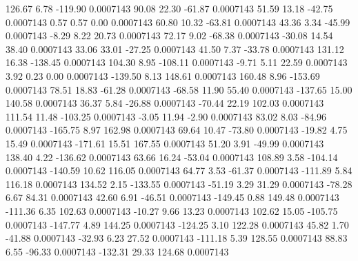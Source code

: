       126.67        6.78     -119.90     0.0007143
       90.08       22.30      -61.87     0.0007143
       51.59       13.18      -42.75     0.0007143
        0.57        0.57        0.00     0.0007143
       60.80       10.32      -63.81     0.0007143
       43.36        3.34      -45.99     0.0007143
       -8.29        8.22       20.73     0.0007143
       72.17        9.02      -68.38     0.0007143
      -30.08       14.54       38.40     0.0007143
       33.06       33.01      -27.25     0.0007143
       41.50        7.37      -33.78     0.0007143
      131.12       16.38     -138.45     0.0007143
      104.30        8.95     -108.11     0.0007143
       -9.71        5.11       22.59     0.0007143
        3.92        0.23        0.00     0.0007143
     -139.50        8.13      148.61     0.0007143
      160.48        8.96     -153.69     0.0007143
       78.51       18.83      -61.28     0.0007143
      -68.58       11.90       55.40     0.0007143
     -137.65       15.00      140.58     0.0007143
       36.37        5.84      -26.88     0.0007143
      -70.44       22.19      102.03     0.0007143
      111.54       11.48     -103.25     0.0007143
       -3.05       11.94       -2.90     0.0007143
       83.02        8.03      -84.96     0.0007143
     -165.75        8.97      162.98     0.0007143
       69.64       10.47      -73.80     0.0007143
      -19.82        4.75       15.49     0.0007143
     -171.61       15.51      167.55     0.0007143
       51.20        3.91      -49.99     0.0007143
      138.40        4.22     -136.62     0.0007143
       63.66       16.24      -53.04     0.0007143
      108.89        3.58     -104.14     0.0007143
     -140.59       10.62      116.05     0.0007143
       64.77        3.53      -61.37     0.0007143
     -111.89        5.84      116.18     0.0007143
      134.52        2.15     -133.55     0.0007143
      -51.19        3.29       31.29     0.0007143
      -78.28        6.67       84.31     0.0007143
       42.60        6.91      -46.51     0.0007143
     -149.45        0.88      149.48     0.0007143
     -111.36        6.35      102.63     0.0007143
      -10.27        9.66       13.23     0.0007143
      102.62       15.05     -105.75     0.0007143
     -147.77        4.89      144.25     0.0007143
     -124.25        3.10      122.28     0.0007143
       45.82        1.70      -41.88     0.0007143
      -32.93        6.23       27.52     0.0007143
     -111.18        5.39      128.55     0.0007143
       88.83        6.55      -96.33     0.0007143
     -132.31       29.33      124.68     0.0007143
